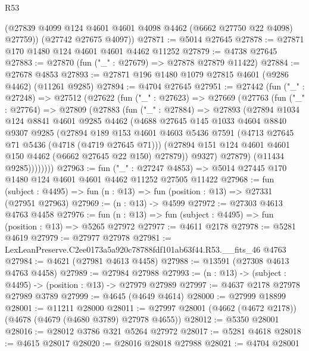 \begin{lexlean}{R53}
\begin{coremodule}
        (@27839 @4099 @124 @4601 @4601 @4098 @4462 (@6662 @27750 @22 @4098) @27759))
      (@27742 @27675 @4097))
@27871 := @5014 @27645
@27878 := @27871 @170 @1480 @124 @4601 @4601 @4462 @11252
@27879 := @4738 @27645
@27883 := @27870 (fun ("_" : @27679) => @27878 @27879 @11422)
@27884 := @27678 @4853
@27893 := @27871 @196 @1480 @1079 @27815 @4601 (@9286 @4462) (@11261 @9285)
@27894 := @4704 @27645
@27951 := @27442
    (fun ("_" : @27248) =>
    @27512
      (@27622
        (fun ("_" : @27623) =>
        @27669
          (@27763
            (fun ("_" : @27764) =>
            @27809
              (@27883
                (fun ("_" : @27884) =>
                @27893
                  (@27894
                    @1034
                    @124
                    @8841
                    @4601
                    @9285
                    @4462
                    (@4688
                      @27645
                      @145
                      @1033
                      @4604
                      @8840
                      @9307
                      @9285
                      (@27894
                        @189
                        @153
                        @4601
                        @4603
                        @5436
                        @7591
                        (@4713 @27645 @71 @5436 (@4718 (@4719 @27645 @71)))
                        (@27894 @151 @124 @4601 @4601 @150 @4462 (@6662 @27645 @22 @150) @27879))
                      @9327)
                    @27879)
                  (@11434 @9285))))))))
@27963 := fun ("_" : @27247 @4853) =>
  @5014 @27445 @170 @1480 @124 @4601 @4601 @4462 @11252 @27505 @11422
@27968 := fun (subject : @4495) => fun (n : @13) => fun (position : @13) => @27331 (@27951 @27963)
@27969 := (n : @13) -> @4599
@27972 := @27303 @4613 @4763 @4458
@27976 := fun (n : @13) => fun (subject : @4495) => fun (position : @13) => @5265 @27972
@27977 := @4611 @2178
@27978 := @5281 @4619
@27979 := @27977 @27978
@27981 := LexLeanPreserve.C2ee0173a5a920c78788fdf101ab63f44.R53.__fits_46 @4763
@27984 := @4621 (@27981 @4613 @4458)
@27988 := @13591 (@27308 @4613 @4763 @4458)
@27989 := @27984 @27988
@27993 := (n : @13) -> (subject : @4495) -> (position : @13) -> @27979 @27989
@27997 := @4637 @2178 @27978 @27989 @3789
@27999 := @4645 (@4649 @4614)
@28000 := @27999 @18899
@28001 := @11211 @28000
@28011 := @27997 @28001 (@4662 (@4672 @2178)) (@4678 (@4679 (@4680 @3789) @27978 @4655))
@28012 := @5350 @28001
@28016 := @28012 @3786 @321 @5264 @27972
@28017 := @5281 @4618
@28018 := @4615 @28017
@28020 := @28016 @28018 @27988
@28021 := @4704 @28001

\end{coremodule}
\end{lexlean}
